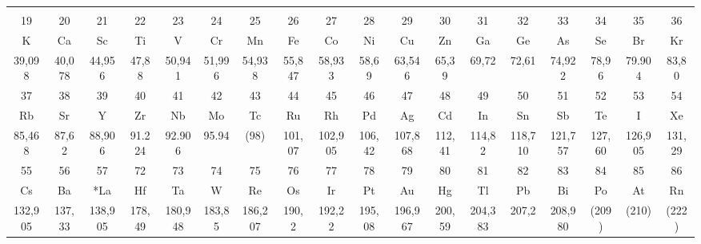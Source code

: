 \documentclass[border=1pt,tikz,landscape]{standalone}
\begin{document}
\begin{center}
\begin{tabular}{|c|c|p{17.8mm}*{9}{p{8.98mm}}|c|c|c|c|c|c|}
\hline
\end{tabular}
\vspace{-3mm}
\begin{tabular}{|c*{16}{|c}|c|}
&&&&&&&&&&&&&&&&&\\[-6.8mm]
\small 19 & \small 20 & \small 21 & \small 22 & \small 23 & \small 24 & \small 25 & \small 26 & \small 27 & \small 28 & \small 29 & \small 30 & \small 31 & \small 32 & \small 33 & \small 34 & \small 35 & \small 36\\
K & Ca & Sc & Ti & V & Cr & Mn & Fe & Co & Ni & Cu & Zn & Ga & Ge & As & Se & Br & Kr\\[-2mm]
\small 39,098 & \small 40,078 & \small 44,956 & \small 47,88 & \small 50,941 & \small 51,996 & \small 54,938 & \small 55,847 & \small 58,933 & \small 58,69 & \small 63,546 & \small 65,39 & \small 69,72 & \small 72,61 & \small 74,922 & \small 78,96 & \small 79.904 & \small 83,80\\[-1mm]
\hline
\small 37 & \small 38 & \small 39 &\small 40& \small 41 & \small 42 & \small 43 & \small 44 & \small 45 & \small 46 & \small 47 & \small 48 & \small 49 & \small 50 & \small 51 & \small 52 & \small 53 & \small 54\\[-1mm]
Rb & Sr & Y & Zr & Nb & Mo & Tc & Ru & Rh & Pd & Ag & Cd & In & Sn & Sb & Te & I & Xe\\[-2mm]
\small 85,468 & \small 87,62 & \small 88,906 & \small 91.224 & \small 92.906 & \small 95.94 & \small (98) & \small 101,07 & \small 102,905 & \small 106,42 & \small 107,868 & \small 112,41 & \small 114,82 & \small 118,710 & \small 121,757 & \small 127,60 & \small 126,905 & \small 131,29\\[-1mm]
\hline
\small 55 & \small 56 & \small 57 & \small 72 & \small 73 & \small 74 & \small 75 & \small 76 & \small 77 & \small 78 & \small 79 & \small 80 & \small 81 & \small 82 & \small 83 & \small 84 & \small 85 & \small 86\\[-1mm]
Cs & Ba & *La & Hf & Ta & W & Re & Os & Ir & Pt & Au & Hg & Tl & Pb & Bi & Po & At & Rn\\[-2mm]
\small 132,905 & \small 137,33 & \small 138,905 & \small 178,49 & \small 180,948 & \small 183,85 & \small 186,207 & \small 190,2 & \small 192,22 & \small 195,08 & \small 196,967 & \small 200,59 & \small 204,383 & \small 207,2 & \small 208,980 & \small (209) & \small (210) & \small (222)\\
\hline
\end{tabular}
\end{center}
\end{document}
